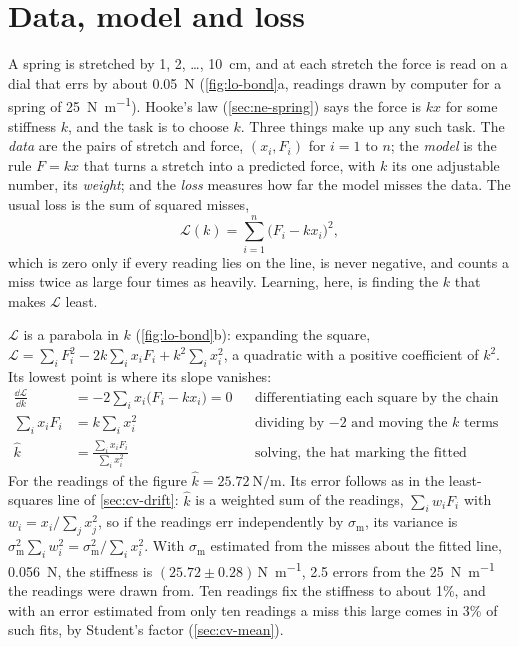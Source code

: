 \section{Data, model and loss}
\label{sec:lo-loss}

A spring is stretched by 1, 2, \dots, \SI{10}{\centi\metre}, and at each
stretch the force is read on a dial that errs by about
\SI{0.05}{\newton} (\cref{fig:lo-bond}a, readings drawn by computer for a
spring of \SI{25}{\newton\per\metre}). Hooke's law (\cref{sec:ne-spring})
says the force is $kx$ for some stiffness $k$, and the task is to choose
$k$. Three things make up any such task. The \emph{data} are the pairs
of stretch and force, $(x_i, F_i)$ for $i = 1$ to $n$; the \emph{model}
is the rule $F = kx$ that turns a stretch into a predicted force, with
$k$ its one adjustable number, its \emph{weight}; and the \emph{loss}
measures how far the model misses the data. The usual loss is the sum of
squared misses,
\begin{equation}
   \mathcal{L}(k) = \sum_{i=1}^n\bigl(F_i - kx_i\bigr)^2 ,
   \label{eq:lo-loss}
\end{equation}
which is zero only if every reading lies on the line, is never negative,
and counts a miss twice as large four times as heavily. Learning, here,
is finding the $k$ that makes $\mathcal{L}$ least.

$\mathcal{L}$ is a parabola in $k$ (\cref{fig:lo-bond}b): expanding the square,
$\mathcal{L} = \sum_iF_i^2 - 2k\sum_ix_iF_i + k^2\sum_ix_i^2$, a quadratic with a
positive coefficient of $k^2$. Its lowest point is where its slope
vanishes:
\begin{align*}
   \frac{\dd\mathcal{L}}{\dd k} &= -2\sum_ix_i\bigl(F_i - kx_i\bigr) = 0
      && \text{differentiating each square by the chain rule}\\
   \sum_ix_iF_i &= k\sum_ix_i^2
      && \text{dividing by $-2$ and moving the $k$ terms}\\
   \hat k &= \frac{\sum_ix_iF_i}{\sum_ix_i^2}
      && \text{solving, the hat marking the fitted value.}
\end{align*}
For the readings of the figure $\hat k = \SI{25.72}{\newton\per\metre}$.
Its error follows as in the least-squares line of \cref{sec:cv-drift}:
$\hat k$ is a weighted sum of the readings, $\sum_iw_iF_i$ with $w_i =
x_i/\sum_jx_j^2$, so if the readings err independently by
$\sigma_{\mathrm m}$, its variance is $\sigma_{\mathrm
m}^2\sum_iw_i^2 = \sigma_{\mathrm m}^2/\sum_ix_i^2$. With
$\sigma_{\mathrm m}$ estimated from the misses about the fitted line,
\SI{0.056}{\newton}, the stiffness is $(25.72 \pm
0.28)$\,\si{\newton\per\metre}, 2.5 errors from the
\SI{25}{\newton\per\metre} the readings were drawn from. Ten readings
fix the stiffness to about 1\%, and with an error estimated from only ten
readings a miss this large comes in 3\% of such fits, by Student's
factor (\cref{sec:cv-mean}).

